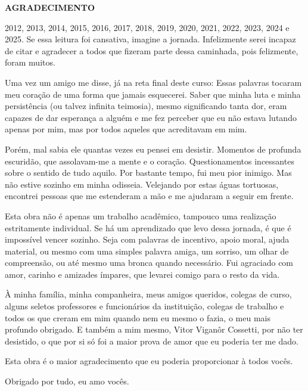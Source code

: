 \begin{center}
\textbf{AGRADECIMENTO}
\end{center}
\vspace{0.5cm}

2012, 2013, 2014, 2015, 2016, 2017, 2018, 2019, 2020, 2021, 2022, 2023, 2024 e 2025. Se essa leitura foi cansativa, imagine a jornada. Infelizmente serei incapaz de citar e agradecer a todos que fizeram parte dessa caminhada, pois felizmente, foram muitos. 

Uma vez um amigo me disse, já na reta final deste curso:  Essas palavras tocaram meu coração de uma forma que jamais esquecerei. Saber que minha luta e minha persistência (ou talvez infinita teimosia), mesmo significando tanta dor, eram capazes de dar esperança a alguém e me fez perceber que eu não estava lutando apenas por mim, mas por todos aqueles que acreditavam em mim.

Porém, mal sabia ele quantas vezes eu pensei em desistir. Momentos de profunda escuridão, que assolavam-me a mente e o coração. Questionamentos incessantes sobre o sentido de tudo aquilo. Por bastante tempo, fui meu pior inimigo. Mas não estive sozinho em minha odisseia. Velejando por estas águas tortuosas, encontrei pessoas que me estenderam a mão e me ajudaram a seguir em frente.

Esta obra não é apenas um trabalho acadêmico, tampouco uma realização estritamente individual. Se há um aprendizado que levo dessa jornada, é que é impossível vencer sozinho. Seja com palavras de incentivo, apoio moral, ajuda material, ou mesmo com uma simples palavra amiga, um sorriso, um olhar de compreensão, ou até mesmo uma bronca quando necessário. Fui agraciado com amor, carinho e amizades ímpares, que levarei comigo para o resto da vida. 

À minha família, minha companheira, meus amigos queridos, colegas de curso, alguns seletos professores e funcionários da instituição, colegas de trabalho e todos os que creram em mim quando nem eu mesmo o fazia, o meu mais profundo obrigado. E também a mim mesmo, Vitor Viganôr Cossetti, por não ter desistido, o que por si só foi a maior prova de amor que eu poderia ter me dado.

Esta obra é o maior agradecimento que eu poderia proporcionar à todos vocês.

Obrigado por tudo, eu amo vocês.
